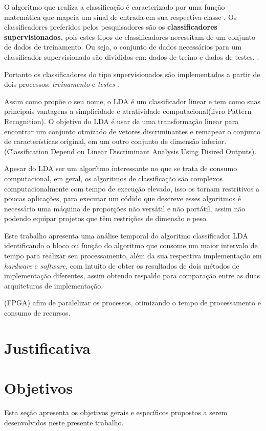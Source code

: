 O algoritmo que realiza a classificação é caracterizado por uma função matemática
que mapeia um sinal de entrada em sua respectiva classe \cite{lottephd}. Os classificadores
preferidos pelos pesquisadores são os \textbf{classificadores supervisionados}, pois estes
tipos de classificadores necessitam de um conjunto de dados de treinamento. Ou seja, o conjunto
de dados necessários para um classificador supervisionado são divididos em: dados de treino e dados
de testes. \cite{Siulybook}.

Portanto os classificadores do tipo supervisionados são implementados a partir de dois processos: \textit{treinamento} e \textit{testes} \cite{Siulybook}.

Assim como propõe o seu nome, o LDA é um classificador linear e tem como suas principais vantagens
a simplicidade e atratividade computacional(livro Pattern Recognition).
O objetivo do LDA é usar de uma transformação linear para encontrar um conjunto otmizado de vetores
discriminantes e remapear o conjunto de características
original, em um outro conjunto de dimensão  inferior.(Classification Depend on Linear Discriminant
Analysis Using Disired Outputs).

Apesar do LDA ser um algorítmo interessante no que se trata de consumo computacional, em geral, os algoritmos de classificação são complexos computacionalmente com tempo de execução elevado,
isso os tornam restritivos a poucas aplicações, para executar um 
códido que descreve esses algoritmos é necessário uma máquina de proporções não versátil e não portátil,
assim não podendo equipar projetos que têm restrições de dimensão e peso.

Este trabalho apresenta uma análise temporal do algoritmo classificador LDA identificando o bloco ou 
função do algoritmo que consome um maior intervalo de tempo para realizar seu processamento, além da
 sua respectiva implementação em \textit{hardware} e \textit{software}, com intuito de obter os resultados
de dois métodos de implementação diferentes, assim obtendo respaldo para comparação entre as duas
arquiteturas de implementação.

(FPGA) afim de paralelizar os processos, otimizando o tempo de processamento e consumo de recursos.

\section{Justificativa}

\section{Objetivos}
Esta seção apresenta os objetivos gerais e específicos propostos a serem desenvolvidos neste
 presente trabalho.
